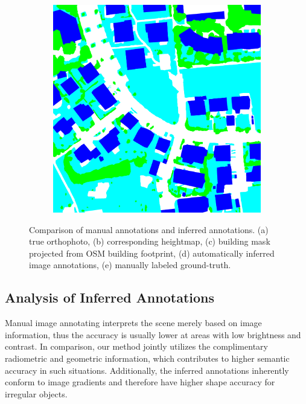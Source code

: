 \begin{figure}[htb]
\begin{subfigure}{0.19\textwidth}
  \caption{}
\end{subfigure}
\begin{subfigure}{0.19\textwidth}
  \centering
  \includegraphics[width=1\linewidth]{fig/vai/37_gt.png}
  \caption{}
\end{subfigure}
\caption{Comparison of manual annotations and inferred annotations. (a) true orthophoto, (b) corresponding heightmap, (c) building mask projected from OSM building footprint, (d) automatically inferred image annotations, (e) manually labeled ground-truth.}
\label{fig:vai_infer}
\end{figure}

\subsection{Analysis of Inferred Annotations}
Manual image annotating interprets the scene merely based on image information, thus the accuracy is usually lower at areas with low brightness and contrast. In comparison, our method jointly utilizes the complimentary radiometric and geometric information, which contributes to higher semantic accuracy in such situations. Additionally, the inferred annotations inherently conform to image gradients and therefore have higher shape accuracy for irregular objects.

